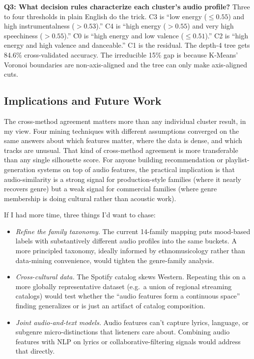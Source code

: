 \documentclass[10pt,twocolumn]{article}
\begin{document}
\textbf{Q3: What decision rules characterize each cluster's audio profile?} Three to four thresholds in plain English do the trick. C3 is ``low energy ($\leq 0.55$) and high instrumentalness ($> 0.53$).'' C4 is ``high energy ($> 0.55$) and very high speechiness ($> 0.55$).'' C0 is ``high energy and low valence ($\leq 0.51$).'' C2 is ``high energy and high valence and danceable.'' C1 is the residual. The depth-4 tree gets 84.6\% cross-validated accuracy. The irreducible 15\% gap is because K-Means' Voronoi boundaries are non-axis-aligned and the tree can only make axis-aligned cuts.

\subsection{Implications and Future Work}
The cross-method agreement matters more than any individual cluster result, in my view. Four mining techniques with different assumptions converged on the same answers about which features matter, where the data is dense, and which tracks are unusual. That kind of cross-method agreement is more transferable than any single silhouette score. For anyone building recommendation or playlist-generation systems on top of audio features, the practical implication is that audio-similarity is a strong signal for production-style families (where it nearly recovers genre) but a weak signal for commercial families (where genre membership is doing cultural rather than acoustic work).

If I had more time, three things I'd want to chase:
\begin{itemize}
    \item \emph{Refine the family taxonomy.} The current 14-family mapping puts mood-based labels with substantively different audio profiles into the same buckets. A more principled taxonomy, ideally informed by ethnomusicology rather than data-mining convenience, would tighten the genre-family analysis.
    \item \emph{Cross-cultural data.} The Spotify catalog skews Western. Repeating this on a more globally representative dataset (e.g.\ a union of regional streaming catalogs) would test whether the ``audio features form a continuous space'' finding generalizes or is just an artifact of catalog composition.
    \item \emph{Joint audio-and-text models.} Audio features can't capture lyrics, language, or subgenre micro-distinctions that listeners care about. Combining audio features with NLP on lyrics or collaborative-filtering signals would address that directly.
\end{itemize}
\end{document}
